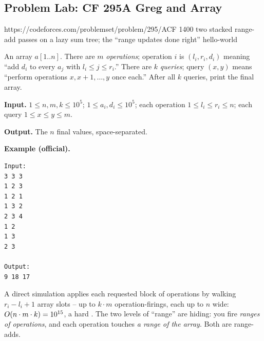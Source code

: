 \subsection{Problem Lab: CF 295A Greg and Array}

  {https://codeforces.com/problemset/problem/295/A}{CF 1400}
  {two stacked range-add passes on a lazy sum tree; the ``range updates done right'' hello-world}

\begin{problemstatement}
An array \(a[1..n]\).  There are \(m\) \emph{operations}; operation \(i\) is \((l_i,r_i,d_i)\) meaning ``add \(d_i\) to every \(a_j\) with \(l_i\le j\le r_i\).''  There are \(k\) \emph{queries}; query \((x,y)\) means ``perform operations \(x,x{+}1,\dots,y\) once each.''  After all \(k\) queries, print the final array.

\textbf{Input.} \(1\le n,m,k\le 10^5\); \(1\le a_i,d_i\le 10^5\); each operation \(1\le l_i\le r_i\le n\); each query \(1\le x\le y\le m\).

\textbf{Output.} The \(n\) final values, space-separated.

\textbf{Example (official).}
\begin{verbatim}
Input:
3 3 3
1 2 3
1 2 1
1 3 2
2 3 4
1 2
1 3
2 3

Output:
9 18 17
\end{verbatim}
\end{problemstatement}

\begin{attemptgate}
A direct simulation applies each requested block of operations by walking \(r_i-l_i+1\) array slots -- up to \(k\cdot m\) operation-firings, each up to \(n\) wide: \(O(n\cdot m\cdot k)=10^{15}\), a hard \tle.  The two levels of ``range'' are hiding: you fire \emph{ranges of operations}, and each operation touches \emph{a range of the array}.  Both are range-adds.
\end{attemptgate}

